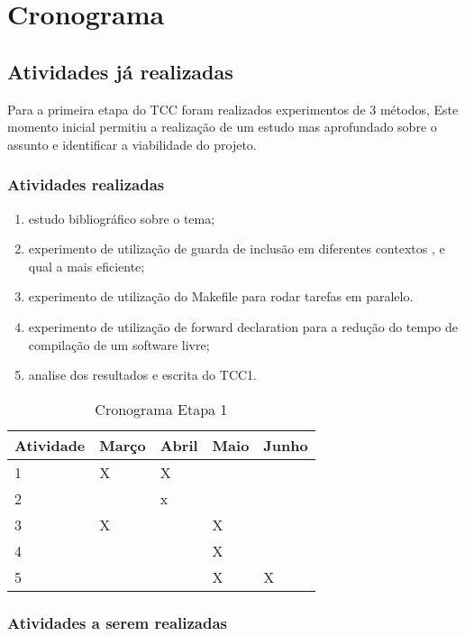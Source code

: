 \chapter[Cronograma]{Cronograma}

\section{Atividades já realizadas}

Para a primeira etapa do TCC foram realizados experimentos de 3 métodos,
 Este momento inicial permitiu a realização de um estudo mas aprofundado
 sobre o assunto e identificar a viabilidade do projeto.


\subsection{Atividades realizadas}

\begin{enumerate}
	\item		estudo bibliográfico sobre o tema;
	\item		experimento de utilização de guarda de inclusão em diferentes contextos , e qual a mais eficiente;
	\item		experimento de utilização do Makefile para rodar tarefas em paralelo.
	\item		experimento de utilização de forward declaration para a redução do tempo de compilação de um software livre;
	\item		analise dos resultados e escrita do TCC1.
\end{enumerate}

\begin{table}[h]
\centering
\begin{tabular}{|l|l|l|l|l|}
Atividade & Março & Abril & Maio & Junho \\ \hline
1         & X     & X     &      &       \\ \hline
2         &       & x     &      &       \\  \hline
3         & X     &       & X    &       \\ \hline
4         &       &       & X    &       \\ \hline
5         &       &       & X   & X   \\   \hline
\end{tabular} 
\caption{Cronograma Etapa 1}
\label{cronograma1}
\end{table}


\subsection {Atividades a serem realizadas}


